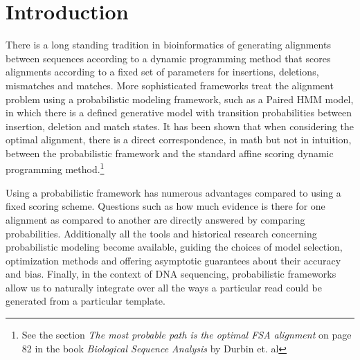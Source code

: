 \documentclass[fleqn,10pt]{SelfArx} %
\begin{document}
\flushbottom %

\maketitle %

\tableofcontents %

\thispagestyle{empty} %


\section{Introduction} %


There is a long standing tradition in bioinformatics of generating alignments between sequences according to a dynamic programming method that scores alignments according to a fixed set of parameters for insertions, deletions, mismatches and matches.  More sophisticated frameworks treat the alignment problem using a probabilistic modeling framework, such as a Paired HMM model, in which there is a defined generative model with transition probabilities between insertion, deletion and match states.  It has been shown that when considering the optimal alignment, there is a direct correspondence, in math but not in intuition, between the probabilistic framework and the standard affine scoring dynamic programming method.\footnote{See the section \textit{The most probable path is the optimal FSA alignment} on page 82 in the book \textit{Biological Sequence Analysis} by Durbin et. al}

Using a probabilistic framework has numerous advantages compared to using a fixed scoring scheme.  Questions such as how much evidence is there for one alignment as compared to another are directly answered by comparing probabilities.  Additionally all the tools and historical research concerning probabilistic modeling become available, guiding the choices of model selection, optimization methods and offering asymptotic guarantees about their accuracy and bias.  Finally, in the context of DNA sequencing, probabilistic frameworks allow us to naturally integrate over all the ways a particular read could be generated from a particular template.
\end{document}
